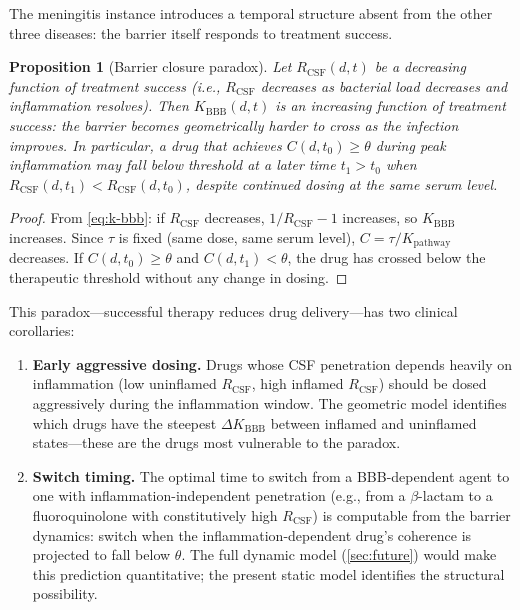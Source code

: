 \documentclass[11pt]{article}
\theoremstyle{plain}
\newtheorem{proposition}[theorem]{Proposition}
\theoremstyle{definition}
\newcommand{\Kpath}{K_{\mathrm{pathway}}}
\begin{document}
The meningitis instance introduces a temporal structure absent
from the other three diseases: the barrier itself responds to
treatment success.

\begin{proposition}[Barrier closure paradox]
\label{prop:barrier-paradox}
Let $R_{\mathrm{CSF}}(d, t)$ be a decreasing function of
treatment success (i.e., $R_{\mathrm{CSF}}$ decreases as
bacterial load decreases and inflammation resolves). Then
$K_{\mathrm{BBB}}(d, t)$ is an increasing function of treatment
success: the barrier becomes geometrically harder to cross as
the infection improves. In particular, a drug that achieves
$C(d, t_0) \geq \theta$ during peak inflammation may fall below
threshold at a later time $t_1 > t_0$ when
$R_{\mathrm{CSF}}(d, t_1) < R_{\mathrm{CSF}}(d, t_0)$,
despite continued dosing at the same serum level.
\end{proposition}

\begin{proof}
From \cref{eq:k-bbb}: if $R_{\mathrm{CSF}}$ decreases,
$1/R_{\mathrm{CSF}} - 1$ increases, so $K_{\mathrm{BBB}}$
increases. Since $\tau$ is fixed (same dose, same serum level),
$C = \tau / \Kpath$ decreases. If $C(d, t_0) \geq \theta$ and
$C(d, t_1) < \theta$, the drug has crossed below the
therapeutic threshold without any change in dosing.
\end{proof}

This paradox---successful therapy reduces drug delivery---has
two clinical corollaries:

\begin{enumerate}
  \item \textbf{Early aggressive dosing.}
    Drugs whose CSF penetration depends heavily on inflammation
    (low uninflamed $R_{\mathrm{CSF}}$, high inflamed
    $R_{\mathrm{CSF}}$) should be dosed aggressively during the
    inflammation window. The geometric model identifies which
    drugs have the steepest $\Delta K_{\mathrm{BBB}}$ between
    inflamed and uninflamed states---these are the drugs most
    vulnerable to the paradox.

  \item \textbf{Switch timing.}
    The optimal time to switch from a BBB-dependent agent to one
    with inflammation-independent penetration (e.g., from a
    $\beta$-lactam to a fluoroquinolone with constitutively high
    $R_{\mathrm{CSF}}$) is computable from the barrier dynamics:
    switch when the inflammation-dependent drug's coherence is
    projected to fall below $\theta$. The full dynamic model
    (\cref{sec:future}) would make this prediction quantitative;
    the present static model identifies the structural possibility.
\end{enumerate}
\end{document}
